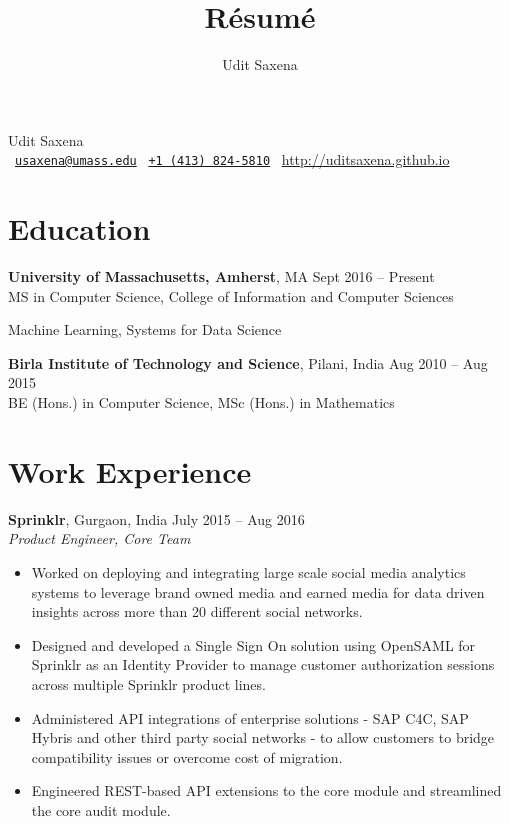 \documentclass[letterpaper]{article}
\title{R\'esum\'e}
\author{Udit Saxena}
\begin{document}
\pagecolor{white}
\begin{center}
\huge
Udit Saxena\\
\small
\faEnvelope~\href{mailto:usaxena@umass.edu}{\nolinkurl{usaxena@umass.edu}}
\faPhone~\href{tel:14138245810}{\texttt{+1 (413) 824-5810}}
\faGlobe~\url{http://uditsaxena.github.io}
\normalsize
\end{center}

\section*{Education}
\vspace{-1mm}
\textbf{University of Massachusetts, Amherst}, MA \hfill Sept 2016 --
    Present\\
MS in Computer Science, College of Information and Computer Sciences
\vspace{-2mm}
\begin{description}[leftmargin=!, labelwidth=\widthof{Coursework },
        font=\normalfont]
    \item[Coursework:] Machine Learning,
                        Systems for Data Science
\end{description}
\vspace{-0.5mm}
\textbf{Birla Institute of Technology and Science}, Pilani, India \hfill
    Aug 2010 -- Aug 2015\\
BE (Hons.) in Computer Science,
MSc (Hons.) in Mathematics

\section*{Work Experience}
\textbf{Sprinklr}, Gurgaon, India \hfill July 2015 -- Aug 2016\\
\emph{Product Engineer, Core Team}\\
\vspace{-6mm}
\begin{itemize}
\item Worked on deploying and integrating large scale social media analytics systems to leverage brand owned media and earned media for data driven insights across more than 20 different social networks.
\vspace{-2mm}
\item Designed and developed a Single Sign On solution using OpenSAML for Sprinklr as an Identity Provider to manage customer authorization sessions across multiple Sprinklr product lines.
\vspace{-2mm}
\item Administered API integrations of enterprise solutions - SAP C4C, SAP Hybris and other third party social networks - to allow customers to bridge compatibility issues or overcome cost of migration. 
\vspace{-2mm}
\item Engineered REST-based API extensions to the core module and streamlined the core audit module.
\end{itemize}
\end{document}
